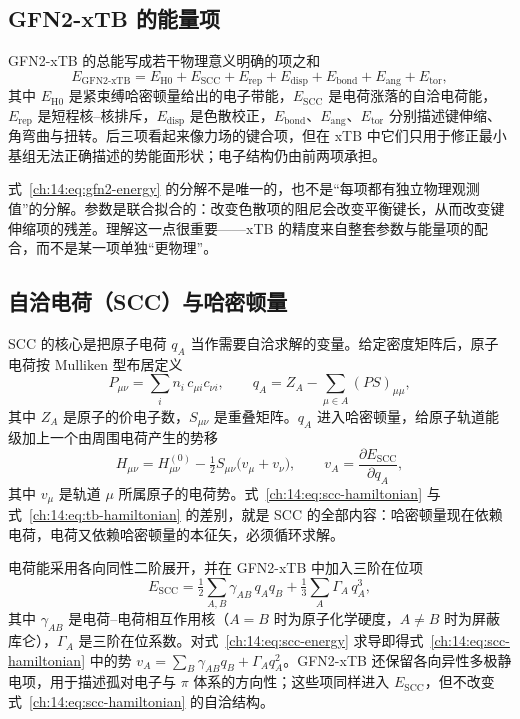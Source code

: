 \subsection{GFN2-xTB 的能量项}
\label{ch:14:sec:gfn2}

GFN2-xTB 的总能写成若干物理意义明确的项之和\citep{bannwarth2019gfn2}
\begin{equation}
E_{\text{GFN2-xTB}}
= E_{\mathrm{H0}} + E_{\mathrm{SCC}} + E_{\mathrm{rep}}
+ E_{\mathrm{disp}} + E_{\mathrm{bond}} + E_{\mathrm{ang}} + E_{\mathrm{tor}},
\label{ch:14:eq:gfn2-energy}
\end{equation}
其中 $E_{\mathrm{H0}}$ 是紧束缚哈密顿量给出的电子带能，$E_{\mathrm{SCC}}$ 是电荷涨落的自洽电荷能，$E_{\mathrm{rep}}$ 是短程核--核排斥，$E_{\mathrm{disp}}$ 是色散校正，$E_{\mathrm{bond}}$、$E_{\mathrm{ang}}$、$E_{\mathrm{tor}}$ 分别描述键伸缩、角弯曲与扭转。后三项看起来像力场的键合项，但在 xTB 中它们只用于修正最小基组无法正确描述的势能面形状；电子结构仍由前两项承担。

式~\eqref{ch:14:eq:gfn2-energy} 的分解不是唯一的，也不是“每项都有独立物理观测值”的分解。参数是联合拟合的：改变色散项的阻尼会改变平衡键长，从而改变键伸缩项的残差。理解这一点很重要——xTB 的精度来自整套参数与能量项的配合，而不是某一项单独“更物理”。

\subsection{自洽电荷（SCC）与哈密顿量}
\label{ch:14:sec:scc}

SCC 的核心是把原子电荷 $q_A$ 当作需要自洽求解的变量。给定密度矩阵后，原子电荷按 Mulliken 型布居定义
\begin{equation}
P_{\mu\nu} = \sum_i n_i\,c_{\mu i}c_{\nu i},
\qquad
q_A = Z_A - \sum_{\mu\in A}(PS)_{\mu\mu},
\label{ch:14:eq:scc-charge}
\end{equation}
其中 $Z_A$ 是原子的价电子数，$S_{\mu\nu}$ 是重叠矩阵。$q_A$ 进入哈密顿量，给原子轨道能级加上一个由周围电荷产生的势移
\begin{equation}
H_{\mu\nu} = H^{(0)}_{\mu\nu}
- \tfrac12 S_{\mu\nu}\bigl(v_\mu + v_\nu\bigr),
\qquad
v_A = \frac{\partial E_{\mathrm{SCC}}}{\partial q_A},
\label{ch:14:eq:scc-hamiltonian}
\end{equation}
其中 $v_\mu$ 是轨道 $\mu$ 所属原子的电荷势。式~\eqref{ch:14:eq:scc-hamiltonian} 与式~\eqref{ch:14:eq:tb-hamiltonian} 的差别，就是 SCC 的全部内容：哈密顿量现在依赖电荷，电荷又依赖哈密顿量的本征矢，必须循环求解。

电荷能采用各向同性二阶展开，并在 GFN2-xTB 中加入三阶在位项
\begin{equation}
E_{\mathrm{SCC}}
= \tfrac12\sum_{A,B}\gamma_{AB}\,q_A q_B
+ \tfrac13\sum_A \Gamma_A\,q_A^3,
\label{ch:14:eq:scc-energy}
\end{equation}
其中 $\gamma_{AB}$ 是电荷--电荷相互作用核（$A=B$ 时为原子化学硬度，$A\neq B$ 时为屏蔽库仑），$\Gamma_A$ 是三阶在位系数。对式~\eqref{ch:14:eq:scc-energy} 求导即得式~\eqref{ch:14:eq:scc-hamiltonian} 中的势
$v_A=\sum_B\gamma_{AB}q_B+\Gamma_A q_A^2$。GFN2-xTB 还保留各向异性多极静电项，用于描述孤对电子与 $\pi$ 体系的方向性；这些项同样进入 $E_{\mathrm{SCC}}$，但不改变式~\eqref{ch:14:eq:scc-hamiltonian} 的自洽结构。

